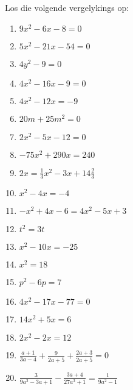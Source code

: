 \begin{exercises}{ }
{
Los die volgende vergelykings op:
\begin{multicols}{2}
\begin{enumerate}[itemsep=2pt, label=\textbf{\arabic*}. ] 
\item  $9x^{2}-6x-8=0$%
\item  $5x^{2}-21x-54=0$%
\item  $4y^{2}-9=0$%
\item  $4x^{2}-16x-9=0$%
\item  $4x^{2}-12x=-9$%
\item  $20m+25{m}^{2}=0$
\item  $2{x}^{2}-5x-12=0$  
\item  $-75{x}^{2}+290x=240$
\item  $2x=\frac{1}{3}{x}^{2}-3x+14\frac{2}{3}$
\item  ${x}^{2}-4x=-4$      
\item  $-{x}^{2}+4x-6=4{x}^{2}-5x+3$       
\item  ${t}^{2}=3t$  
\item  ${x}^{2}-10x=-25$      
\item  ${x}^{2}=18$
\item  ${p}^{2}-6p=7$
\item  $4{x}^{2}-17x-77=0$
\item  $14{x}^{2}+5x=6$
\item  $2{x}^{2}-2x=12$
\item  $\frac{a+1}{3a-4}+\frac{9}{2a+5}+\frac{2a+3}{2a+5}=0$
\item  $\frac{3}{9a^2-3a+1}-\frac{3a+4}{27a^3+1}=\frac{1}{9a^2-1}$                
\end{enumerate}
\end{multicols}

}
\end{exercises}



